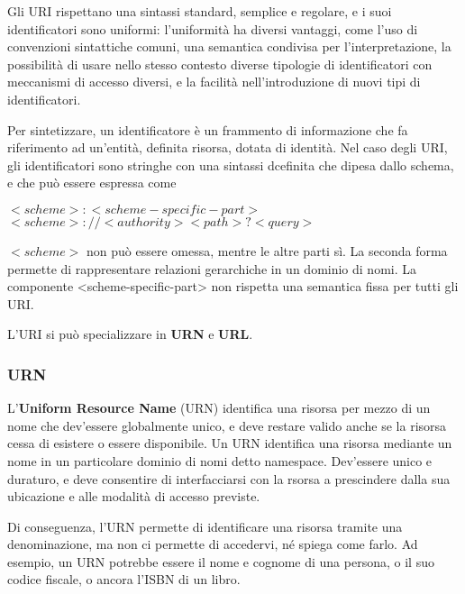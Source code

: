 Gli URI rispettano una sintassi standard, semplice e regolare, e i suoi identificatori sono uniformi: l'uniformità ha diversi vantaggi, come l'uso di convenzioni sintattiche comuni, una semantica condivisa per l'interpretazione, la possibilità di usare nello stesso contesto diverse tipologie di identificatori con meccanismi di accesso diversi, e la facilità nell'introduzione di nuovi tipi di identificatori.

\vspace{3mm}

Per sintetizzare, un identificatore è un frammento di informazione che fa riferimento ad un'entità, definita risorsa, dotata di identità. Nel caso degli URI, gli identificatori sono stringhe con una sintassi dcefinita che dipesa dallo schema, e che può essere espressa come

\begin{center}
\(<scheme>:<scheme-specific-part>\)
\(<scheme>://<authority><path>?<query>\)
\end{center}

\(<scheme>\) non può essere omessa, mentre le altre parti sì. La seconda forma permette di rappresentare relazioni gerarchiche in un dominio di nomi. La componente <scheme-specific-part> non rispetta una semantica fissa per tutti gli URI.

\vspace{3mm}

L'URI si può specializzare in \textbf{URN} e \textbf{URL}.

\subsubsection{URN}

L'\textbf{Uniform Resource Name} (URN) identifica una risorsa per mezzo di un nome che dev'essere globalmente unico, e deve restare valido anche se la risorsa cessa di esistere o essere disponibile. 
Un URN identifica una risorsa mediante un nome in un particolare dominio di nomi detto namespace. Dev'essere unico e duraturo, e deve consentire di interfacciarsi con la rsorsa a prescindere dalla sua ubicazione e alle modalità di accesso previste. 

\vspace{3mm}

Di conseguenza, l'URN permette di identificare una risorsa tramite una denominazione, ma non ci permette di accedervi, né spiega come farlo. Ad esempio, un URN potrebbe essere il nome e cognome di una persona, o il suo codice fiscale, o ancora l'ISBN di un libro.
    
